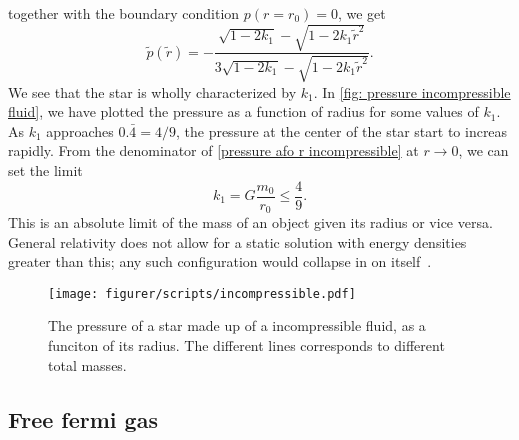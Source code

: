 together with the boundary condition $p(r = r_0) = 0$, we get 
%
\begin{equation}
    \label{pressure afo r incompressible}
    \tilde p(\tilde r) 
    = 
    - \frac{\sqrt{1 - 2 k_1} - \sqrt{1 - 2 k_1 \tilde r^2}}{3 \sqrt{1 - 2 k_1 } - \sqrt{1 - 2 k_1 \tilde r^2}}.
\end{equation}
%
We see that the star is wholly characterized by $k_1$.
In \autoref{fig: pressure incompressible fluid}, we have plotted the pressure as a function of radius for some values of $k_1$.
As $k_1$ approaches $0.\bar 4 = 4/9$, the pressure at the center of the star start to increas rapidly.
From the denominator of \autoref{pressure afo r incompressible} at $r\rightarrow 0$, we can set the limit
%
\begin{equation}
    k_1 = G \frac{m_0}{r_0} \leq \frac{4}{9}.
\end{equation}
%
This is an absolute limit of the mass of an object given its radius or vice versa.
General relativity does not allow for a static solution with energy densities greater than this; any such configuration would collapse in on itself~\autocite{carrollSpacetimeGeometryIntroduction2019}.

\begin{figure}
    \centering
    \texttt{[image: figurer/scripts/incompressible.pdf]}
    \caption{The pressure of a star made up of a incompressible fluid, as a funciton of its radius. The different lines corresponds to different total masses.}
    \label{fig: pressure incompressible fluid}
\end{figure}


\subsection*{Free fermi gas}

